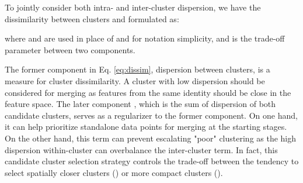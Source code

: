 \documentclass[journal]{IEEEtran}
\begin{document}
To jointly consider both intra- and inter-cluster dispersion, we have the dissimilarity between clusters  and  formulated as:

where  and  are used in place of  and  for notation simplicity, and  is the trade-off parameter between two components. 

The former component  in Eq. \eqref{eq:dissim}, dispersion between clusters, is a measure for cluster dissimilarity. A cluster with low dispersion should be considered for merging as features from the same identity should be close in the feature space. The later component , which is the sum of dispersion of both candidate clusters, serves as a regularizer to the former component. On one hand, it can help prioritize standalone data points for merging at the starting stages. On the other hand, this term can prevent escalating "poor" clustering as the high dispersion within-cluster can overbalance the inter-cluster term. In fact, this candidate cluster selection strategy controls the trade-off between the tendency to select spatially closer clusters () or more compact clusters ().
\end{document}
